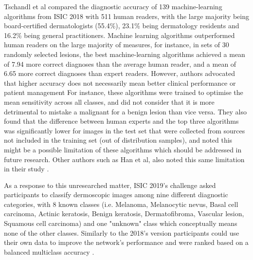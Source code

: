 Tschandl et al \cite{humanvsisic2018} compared the diagnostic accuracy of 139 machine-learning algorithms from ISIC 2018 with 511 human readers, with the large majority being board-certified dermatologists (55.4\%), 23.1\% being dermatology residents and 16.2\% being general practitioners. Machine learning algorithms outperformed human readers on the large majority of measures, for instance, in sets of 30 randomly selected lesions, the best machine-learning algorithms achieved a mean of 7.94 more correct diagnoses than the average human reader, and a mean of 6.65 more correct diagnoses than expert readers. However, authors advocated that higher accuracy does not necessarily mean better clinical performance or patient management For instance, these algorithms were trained to optimise the mean sensitivity across all classes, and did not consider that it is more detrimental to mistake a malignant for a benign lesion than vice versa. They also found that the difference between human experts and the top three algorithms was significantly lower for images in the test set that were collected from sources not included in the training set (out of distribution samples), and noted this might be a possible limitation of these algorithms which should be addressed in future research. Other authors such as Han et al, also noted this same limitation in their study \cite{Han2018}. \par 

As a response to this unresearched matter, ISIC 2019's challenge asked participants to classify dermoscopic images among nine different diagnostic categories, with 8 known classes (i.e. Melanoma, Melanocytic nevus, Basal cell carcinoma, Actinic keratosis, Benign keratosis, Dermatofibroma, Vascular lesion, Squamous cell carcinoma) and one "unknown" class which conceptually means none of the other classes. Similarly to the 2018's version participants could use their own data to improve the network's performance and were ranked based on a balanced multiclass accuracy \cite{isic2019}. \par

